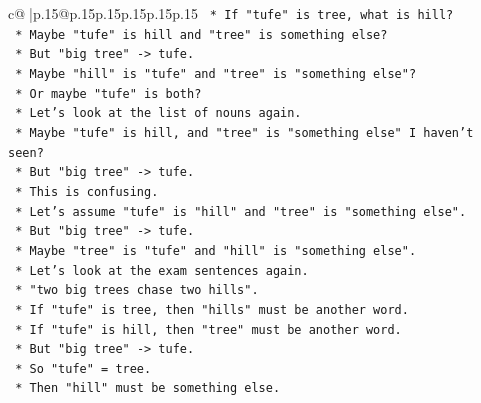 \documentclass{article}
\begin{document}
{\begin{supertabular}{c@{$\;$}|p{.15\linewidth}@{}p{.15\linewidth}p{.15\linewidth}p{.15\linewidth}p{.15\linewidth}p{.15\linewidth}}
{{{\texttt{                                                *   If "tufe" is tree, what is hill?} \\
\texttt{                                                *   Maybe "tufe" is hill and "tree" is something else?} \\
\texttt{                                                *   But "big tree" {-}> tufe.} \\
\texttt{                                                *   Maybe "hill" is "tufe" and "tree" is "something else"?} \\
\texttt{                                                *   Or maybe "tufe" is both?} \\
\texttt{                                                *   Let's look at the list of nouns again.} \\
\texttt{                                                *   Maybe "tufe" is hill, and "tree" is "something else" I haven't seen?} \\
\texttt{                                                *   But "big tree" {-}> tufe.} \\
\texttt{                                                *   This is confusing.} \\
\texttt{                                                *   Let's assume "tufe" is "hill" and "tree" is "something else".} \\
\texttt{                                                *   But "big tree" {-}> tufe.} \\
\texttt{                                                *   Maybe "tree" is "tufe" and "hill" is "something else".} \\
\texttt{                                                *   Let's look at the exam sentences again.} \\
\texttt{                                                *   "two big trees chase two hills".} \\
\texttt{                                                *   If "tufe" is tree, then "hills" must be another word.} \\
\texttt{                                                *   If "tufe" is hill, then "tree" must be another word.} \\
\texttt{                                                *   But "big tree" {-}> tufe.} \\
\texttt{                                                *   So "tufe" = tree.} \\
\texttt{                                                *   Then "hill" must be something else.} \\
}}}
\end{supertabular}}
\end{document}
